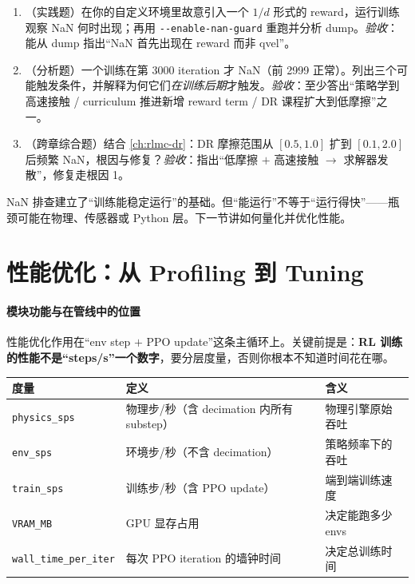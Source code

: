 \begin{practice}
\begin{enumerate}
\item （实践题）在你的自定义环境里故意引入一个 $1/d$ 形式的 reward，运行训练观察 NaN 何时出现；再用 \verb|--enable-nan-guard| 重跑并分析 dump。\emph{验收}：能从 dump 指出“NaN 首先出现在 reward 而非 qvel”。
\item （分析题）一个训练在第 3000 iteration 才 NaN（前 2999 正常）。列出三个可能触发条件，并解释为何它们\emph{在训练后期}才触发。\emph{验收}：至少答出“策略学到高速接触 / curriculum 推进新增 reward term / DR 课程扩大到低摩擦”之一。
\item （跨章综合题）结合 \cref{ch:rlmc-dr}：DR 摩擦范围从 $[0.5,1.0]$ 扩到 $[0.1,2.0]$ 后频繁 NaN，根因与修复？\emph{验收}：指出“低摩擦 $+$ 高速接触 $\to$ 求解器发散”，修复走根因 1。
\end{enumerate}
\end{practice}

NaN 排查建立了“训练能稳定运行”的基础。但“能运行”不等于“运行得快”——瓶颈可能在物理、传感器或 Python 层。下一节讲如何量化并优化性能。

\section{性能优化：从 Profiling 到 Tuning}
\label{sec:rlmc-ls-perf}

\paragraph{\texorpdfstring{ 模块功能与在管线中的位置}{1 模块功能与在管线中的位置}}性能优化作用在“env step $+$ PPO update”这条主循环上。关键前提是：\textbf{RL 训练的性能不是“steps/s”一个数字}，要分层度量，否则你根本不知道时间花在哪。

\begin{center}
\small
\begin{tabular}{@{}p{2.8cm}p{5.0cm}p{4.4cm}@{}}
\toprule
度量 & 定义 & 含义 \\
\midrule
\verb|physics_sps| & 物理步/秒（含 decimation 内所有 substep） & 物理引擎原始吞吐 \\
\verb|env_sps| & 环境步/秒（不含 decimation） & 策略频率下的吞吐 \\
\verb|train_sps| & 训练步/秒（含 PPO update） & 端到端训练速度 \\
\verb|VRAM_MB| & GPU 显存占用 & 决定能跑多少 envs \\
\verb|wall_time_per_iter| & 每次 PPO iteration 的墙钟时间 & 决定总训练时间 \\
\bottomrule
\end{tabular}
\end{center}


